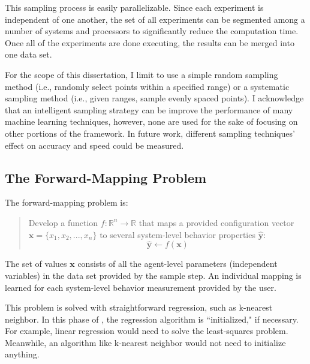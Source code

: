 This sampling process is easily parallelizable.
Since each experiment is independent of one another, the set of all experiments can be segmented among a number of systems and processors to significantly reduce the computation time.
Once all of the experiments are done executing, the results can be merged into one data set.

For the scope of this dissertation, I limit \fw to use a simple random sampling method (i.e., randomly select points within a specified range) or a systematic sampling method (i.e., given ranges, sample evenly spaced points).
I acknowledge that an intelligent sampling strategy can be improve the performance of many machine learning techniques, however, none are used for the sake of focusing on other portions of the framework.
In future work, different sampling techniques' effect on accuracy and speed could be measured.



\subsection{The Forward-Mapping Problem}


The forward-mapping problem is:
\begin{quote} Develop a function $f: \mathbb{R}^n \rightarrow \mathbb{R}$ that maps a provided configuration vector $\mathbf x = \{x_1, x_2, ..., x_n \}$ to several system-level behavior properties $\hat {\mathbf y}$:
\[\hat {\mathbf y} \leftarrow f(\mathbf x)\]
\end{quote}
The set of values $\mathbf x$ consists of all the agent-level parameters (independent variables) in the data set provided by the sample step.
An individual mapping is learned for each system-level behavior measurement provided by the user.

This problem is solved with straightforward regression, such as k-nearest neighbor.
In this phase of \fw, the regression algorithm is ``initialized," if necessary.
For example, linear regression would need to solve the least-squares problem.
Meanwhile, an algorithm like k-nearest neighbor would not need to initialize anything.

